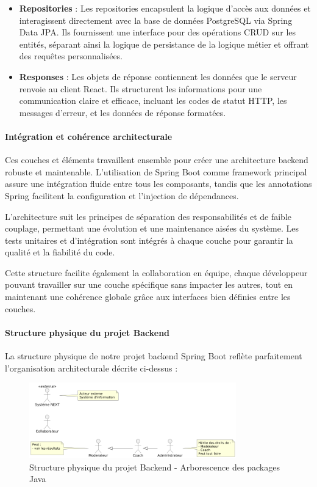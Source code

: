 \documentclass[12pt,a4paper]{report}
\begin{document}
\begin{itemize}
\item \textbf{Repositories} : Les repositories encapsulent la logique d'accès aux données et interagissent directement avec la base de données PostgreSQL via Spring Data JPA. Ils fournissent une interface pour des opérations CRUD sur les entités, séparant ainsi la logique de persistance de la logique métier et offrant des requêtes personnalisées.

\item \textbf{Responses} : Les objets de réponse contiennent les données que le serveur renvoie au client React. Ils structurent les informations pour une communication claire et efficace, incluant les codes de statut HTTP, les messages d'erreur, et les données de réponse formatées.
\end{itemize}

\paragraph{Intégration et cohérence architecturale}

Ces couches et éléments travaillent ensemble pour créer une architecture backend robuste et maintenable. L'utilisation de Spring Boot comme framework principal assure une intégration fluide entre tous les composants, tandis que les annotations Spring facilitent la configuration et l'injection de dépendances.

L'architecture suit les principes de séparation des responsabilités et de faible couplage, permettant une évolution et une maintenance aisées du système. Les tests unitaires et d'intégration sont intégrés à chaque couche pour garantir la qualité et la fiabilité du code.

Cette structure facilite également la collaboration en équipe, chaque développeur pouvant travailler sur une couche spécifique sans impacter les autres, tout en maintenant une cohérence globale grâce aux interfaces bien définies entre les couches.

\paragraph{Structure physique du projet Backend}

La structure physique de notre projet backend Spring Boot reflète parfaitement l'organisation architecturale décrite ci-dessus :

\begin{figure}[H]
\centering
\includegraphics[width=0.8\textwidth]{latex_media/media/structure_backend_quizapp.png}
\caption{Structure physique du projet Backend - Arborescence des packages Java}
\label{fig:structure-backend}
\end{figure}
\end{document}
